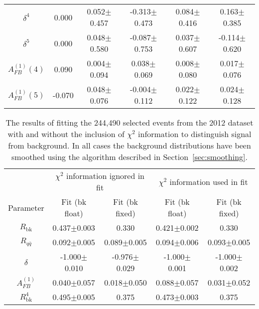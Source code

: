 \documentclass{cmspaperpdf}
\begin{document}
\begin{table}[hbt]
\begin{center}
\begin{tabular}{|c|c|cc|cc|}
$\delta^4$        & 0.000 & 0.052$\pm$0.457  & -0.313$\pm$0.473                    & 0.084$\pm$0.416  & 0.163$\pm$0.385  \\ 
$\delta^5$        & 0.000 & 0.048$\pm$0.580  & -0.087$\pm$0.753                    & 0.037$\pm$0.607  & -0.114$\pm$0.620 \\ 
$A^{(1)}_{FB}(4)$ & 0.090 & 0.004$\pm$0.094  & 0.038$\pm$0.069                     & 0.008$\pm$0.080  & 0.017$\pm$0.076  \\
$A^{(1)}_{FB}(5)$ & -0.070 & 0.048$\pm$0.076  & -0.004$\pm$0.112                   & 0.022$\pm$0.122  & 0.024$\pm$0.128  \\
\hline
\end{tabular}
\end{center}
\end{table}

\begin{table}[hbt]
\begin{center}
\caption{\small \label{tab:no_Chi2_data} The results of fitting the 244,490 selected events from the 2012 dataset with and without the inclusion of $\chi^{2}$ information to distinguish signal from background. In all cases the background distributions have been smoothed using the algorithm described in Section~\ref{sec:smoothing}.}
\vspace{3pt}
\begin{tabular}{|c|cc|cc|}\hline
                  & \multicolumn{2}{|c|}{$\chi^{2}$ information ignored in fit} & \multicolumn{2}{c|}{$\chi^{2}$ information used in fit} \\
Parameter         & Fit (bk float)    & Fit (bk fixed)                          & Fit (bk float)   & Fit (bk fixed)    \\ 
\hline
$R_\mathrm{bk}$   & 0.437$\pm$0.003   & 0.330                                   & 0.421$\pm$0.002   & 0.330            \\ 
$R_{q\bar q}$     & 0.092$\pm$0.005   & 0.089$\pm$0.005                         & 0.094$\pm$0.006   & 0.093$\pm$0.005  \\ 
$\delta$          & -1.000$\pm$0.010  & -0.976$\pm$0.029                        & -1.000$\pm$0.001  & -1.000$\pm$0.002 \\ 
$A^{(1)}_{FB}$    & 0.040$\pm$0.057   & 0.018$\pm$0.050                         & 0.088$\pm$0.057   & 0.031$\pm$0.052  \\ 
\hline
$R^4_\mathrm{bk}$ & 0.495$\pm$0.005   & 0.375                                   & 0.473$\pm$0.003   & 0.375            \\ 

\end{tabular}
\end{center}
\end{table}
\end{document}
